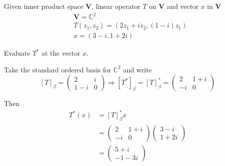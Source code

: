 \begin{homeworkProblem}

Given inner product space $\mathbf{V}$, linear operator $T$ on $\mathbf{V}$ and
vector $x$ in $\mathbf{V}$
\[
\begin{aligned}
    &\mathbf{V} = \mathbb{C}^2\\
    &T(z_1, z_2) = (2z_1 + iz_2, (1-i)z_1)\\
    &x = (3-i, 1+2i)
\end{aligned}
\]

Evaluate $T^*$ at the vector $x$.

\solution

Take the standard ordered basis for $\mathbb{C}^2$ and write \[
[T]_\beta = \begin{pmatrix}
    2 & i \\
    1-i & 0
\end{pmatrix}
\Longrightarrow
[T^*]_\beta = [T]_\beta^* = \begin{pmatrix}
    2 & 1+i \\
    -i & 0
\end{pmatrix}
\]

Then \[
\begin{aligned}
T^*(x) &= [T]_\beta^* x \\
&= \begin{pmatrix}
    2 & 1+i \\
    -i & 0
\end{pmatrix} \begin{pmatrix}
    3-i \\
    1+ 2i
\end{pmatrix}\\
&= \begin{pmatrix}
    5 +i \\
    -1 -3i
\end{pmatrix}
\end{aligned}
\]

\end{homeworkProblem}
